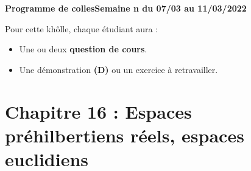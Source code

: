 \documentclass[twoside,a4paper,french,10pt]{VcCours}
\begin{document}

\begin{center}
\large\bf
Programme de collesSemaine n du 07/03 au 11/03/2022
\end{center}
\separationTitre


Pour cette khôlle, chaque étudiant aura :
\begin{itemize}
\item Une ou deux \textbf{question de cours}.
\item Une démonstration \textbf{(D)} ou un exercice à retravailler.
\end{itemize} 
  

\section*{Chapitre 16 : Espaces préhilbertiens réels, espaces euclidiens}
\end{document}
